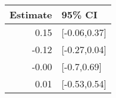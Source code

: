 \begin{tabular}{rl}
  \hline
Estimate & 95\% CI \\ 
  \hline
0.15 & [-0.06,0.37] \\ 
  -0.12 & [-0.27,0.04] \\ 
  -0.00 & [-0.7,0.69] \\ 
  0.01 & [-0.53,0.54] \\ 
   \hline
\end{tabular}

